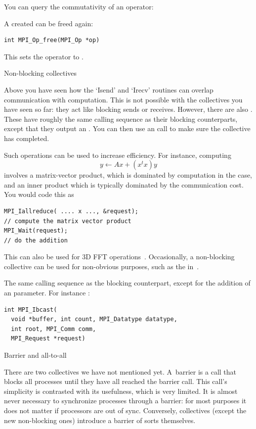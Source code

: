 You can query the commutativity of an operator:
%

A created  can be freed again:
%
\begin{verbatim}
int MPI_Op_free(MPI_Op *op)
\end{verbatim}
%
This sets the operator to .

 {Non-blocking collectives}
\label{sec:mpi3collect}

Above you have seen how the `Isend' and `Irecv' routines can overlap communication
with computation. This is not possible with the collectives you have seen so far:
they act like blocking sends or receives.
However, there are also .
These have roughly the same calling sequence as their blocking counterparts,
except that they output an . You
can then use an  call to make sure the collective
has completed.

Such operations can be used to increase efficiency.
For instance, computing
\[ y \leftarrow Ax + (x^tx)y \]
involves a matrix-vector product, which is dominated by computation
in the  case, and an inner product which is 
typically dominated by the communication cost. You would code this as
\begin{verbatim}
MPI_Iallreduce( .... x ..., &request);
// compute the matrix vector product
MPI_Wait(request);
// do the addition
\end{verbatim}

This can also be used for 3D FFT operations~\cite{Hoefler:case-for-nbc}.
Occasionally, a non-blocking collective can be used for non-obvious purposes,
such as the  in~\cite{Hoefler:2010:SCP}.

The same calling sequence as the blocking counterpart, except for the addition
of an  parameter. For instance 
:
\begin{verbatim}
int MPI_Ibcast(
  void *buffer, int count, MPI_Datatype datatype,
  int root, MPI_Comm comm, 
  MPI_Request *request)
\end{verbatim}



 {Barrier and all-to-all}
\label{sec:barrier}
\label{sec:alltoall}

There are two collectives we have not mentioned yet. A~barrier is a
call that blocks all processes until they have all reached the barrier
call. This call's simplicity is contrasted with its usefulness, which
is very limited. It is almost never necessary to synchronize processes
through a barrier: for most purposes it does not matter if processors
are out of sync. Conversely, collectives (except the new non-blocking
ones) introduce a barrier of sorts themselves.

